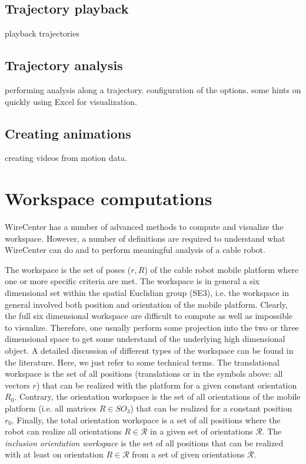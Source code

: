 \documentclass[11pt,a4paper,onepage,openany]{book}
\begin{document}
\section{Trajectory playback}
playback trajectories

\section{Trajectory analysis}
performing analysis along a trajectory. configuration of the options. some
hints on quickly using Excel for visualization.

\section{Creating animations}
creating videos from motion data.

\chapter{Workspace computations}\label{sec:Workspace}%
WireCenter has a number of advanced methods to compute and visualize the
workspace. However, a number of definitions are required to understand what
WireCenter can do and to perform meaningful analysis of a cable robot.

The workspace is the set of poses ($r,R$) of the cable robot mobile platform
where one or more specific criteria are met. The workspace is in general a six
dimensional set within the spatial Euclidian group (SE3), i.e. the workspace in
general involved both position and orientation of the mobile platform. Clearly,
the full six dimensional workspace are difficult to compute as well as
impossible to visualize. Therefore, one usually perform some projection into
the two or three dimensional space to get some understand of the underlying
high dimensional object. A detailed discussion of different types of the
workspace can be found in the literature. Here, we just refer to some technical
terms. The translational workspace is the set of all positions (translations or
in the symbols above: all vectors $r$) that can be realized with the platform
for a given constant orientation $R_0$. Contrary, the orientation workspace is
the set of all orientations of the mobile platform (i.e. all matrices $R\in
SO_3$) that can be realized for a constant position $r_0$. Finally, the total
orientation workspace is a set of all positions where the robot can realize all
orientations $R\in\mathcal R$ in a given set of orientations $\mathcal R$. The
\emph{inclusion orientation workspace} is the set of all positions that can be
realized with at least on orientation $R\in\mathcal R$ from a set of given
orientations $\mathcal R$.
\end{document}
